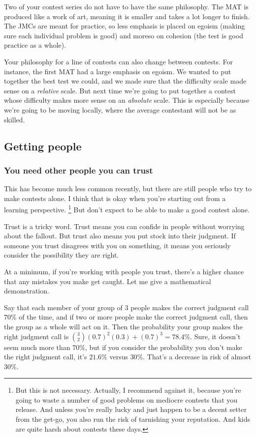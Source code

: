 \documentclass[points=false]{bounce}
\begin{document}
Two of your contest series do not have to have the same philosophy. The MAT is produced like a work of art, meaning it is smaller and takes a lot longer to finish. The JMCs are meant for practice, so less emphasis is placed on egoism (making sure each individual problem is good) and moreso on cohesion (the test is good practice as a whole).

Your philosophy for a line of contests can also change between contests. For instance, the first MAT had a large emphasis on egoism. We wanted to put together the best test we could, and we made sure that the difficulty scale made sense on a \emph{relative} scale. But next time we're going to put together a contest whose difficulty makes more sense on an \emph{absolute} scale. This is especially because we're going to be moving locally, where the average contestant will not be as skilled.

\subsection{Getting people}

\subsubsection{You need other people you can trust}

This has become much less common recently, but there are still people who try to make contests alone.
I think that is okay when you're starting out from a learning perspective.
\footnote{
	But this is not necessary. Actually, I recommend against it, because you're going to waste a number of good problems
	on mediocre contests that you release. And unless you're really lucky and just happen to be a decent setter from the get-go,
	you also run the risk of tarnishing your reputation. And kids are quite harsh about contests these days. 
}
But don't expect to be able to make a good contest alone.

Trust is a tricky word. Trust means you can confide in people without worrying about the fallout.
But trust also means you put stock into their judgment.
If someone you trust disagrees with you on something, it means you seriously consider the possibility they are right.

At a minimum, if you're working with people you trust, there's a higher chance that any mistakes you make get caught.
Let me give a mathematical demonstration.

\begin{exam}
Say that each member of your group of $3$ people makes the correct judgment call $70\%$ of the time,
and if two or more people make the correct judgment call, then the group as a whole will act on it.
Then the probability your group makes the right judgment call is $\binom{3}{2}(0.7)^2(0.3)+(0.7)^3=78.4\%$.
Sure, it doesn't seem much more than $70\%$, but if you consider the probability you don't make
the right judgment call, it's $21.6\%$ versus $30\%$. That's a decrease in risk of almost $30\%$.
\end{exam}
\end{document}

